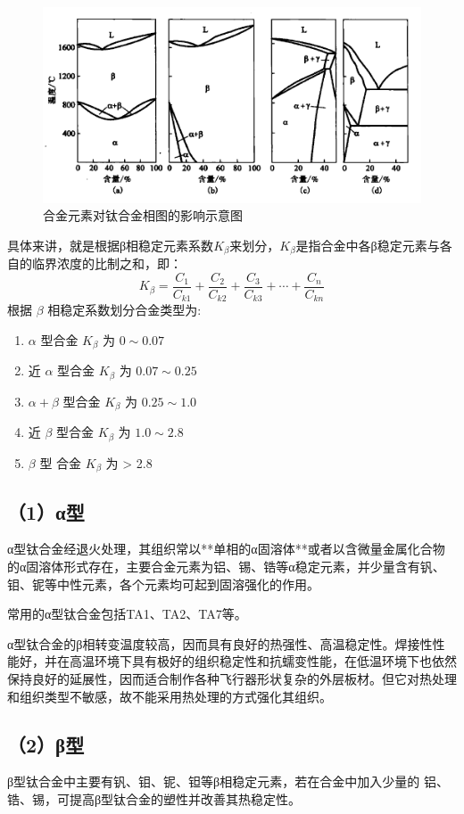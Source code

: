 \begin{figure}[h!]
	\centering
	\includegraphics[width=0.9\linewidth]{pic/01}
	\caption{合金元素对钛合金相图的影响示意图}
	\label{fig:01}
\end{figure}
具体来讲，就是根据β相稳定元素系数$K_{\beta}$来划分，$K_{\beta}$是指合金中各β稳定元素与各自的临界浓度的比制之和，即：
$$
K_{\beta}=\frac{ C_{1} }{C_{k1}}+\frac{ C_{2} }{C_{k2}}+\frac{ C_{3} }{C_{k3}}+\cdots+\frac{ C_{n} }{C_{kn}}
$$
根据 $\beta$ 相稳定系数划分合金类型为:
\begin{enumerate}
	\item  $\alpha$ 型合金 $K_\beta$ 为 $0 \sim 0.07$
	\item 近 $\alpha$ 型合金 $K_\beta$ 为 $0.07 \sim 0.25$
	\item $\alpha+\beta$ 型合金 $K_\beta$ 为 $0.25 \sim 1.0$
	\item 近 $\beta$ 型合金 $K_\beta$ 为 $1.0 \sim 2.8$
	\item $\beta$ 型 合金 $K_\beta$ 为 > 2.8
\end{enumerate}
\subsection*{（1）α型}
α型钛合金经退火处理，其组织常以**单相的α固溶体**或者以含微量金属化合物的α固溶体形式存在，主要合金元素为铝、锡、锆等α稳定元素，并少量含有钒、 钼、铌等中性元素，各个元素均可起到固溶强化的作用。

常用的α型钛合金包括TA1、TA2、TA7等。

α型钛合金的β相转变温度较高，因而具有良好的热强性、高温稳定性。焊接性性能好，并在高温环境下具有极好的组织稳定性和抗蠕变性能，在低温环境下也依然保持良好的延展性，因而适合制作各种飞行器形状复杂的外层板材。但它对热处理和组织类型不敏感，故不能采用热处理的方式强化其组织。
\subsection*{（2）β型}
β型钛合金中主要有钒、钼、铌、钽等β相稳定元素，若在合金中加入少量的 铝、锆、锡，可提高β型钛合金的塑性并改善其热稳定性。

